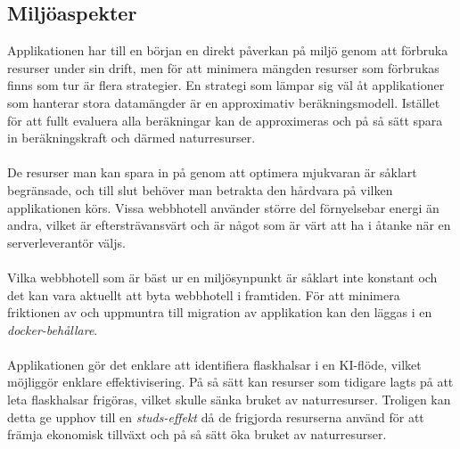 \subsection{Miljöaspekter}
\label{sec:enviromental-aspects}
Applikationen har till en början en direkt påverkan på miljö genom att förbruka resurser under sin drift,
men för att minimera mängden resurser som förbrukas finns som tur är flera strategier. En
strategi som lämpar sig väl åt applikationer som hanterar stora datamängder är en approximativ
beräkningsmodell. \cite{greensoft} Istället för att fullt evaluera alla beräkningar kan de approximeras
och på så sätt spara in beräkningskraft och därmed naturresurser.
\\ \\
De resurser man kan spara in på genom att optimera mjukvaran är såklart begränsade, och till slut
behöver man betrakta den hårdvara på vilken applikationen körs. Vissa webbhotell använder större del
förnyelsebar energi än andra, vilket är eftersträvansvärt och är något som är värt att
ha i åtanke när en serverleverantör väljs.
\\ \\
Vilka webbhotell som är bäst ur en miljösynpunkt är såklart inte konstant och det kan vara aktuellt att byta
webbhotell i framtiden. För att minimera friktionen av och uppmuntra till migration av applikation
kan den läggas i en \textit{docker-behållare}. \cite{website:docker}
\\ \\
Applikationen gör det enklare att identifiera flaskhalsar i en KI-flöde, vilket möjliggör enklare
effektivisering. På så sätt kan resurser som tidigare lagts på att leta flaskhalsar frigöras,
vilket skulle sänka bruket av naturresurser. Troligen kan detta ge upphov till en \textit{studs-effekt}
då de frigjorda resurserna använd för att främja ekonomisk tillväxt och på så sätt öka bruket av
naturresurser. \cite{greensoft}





